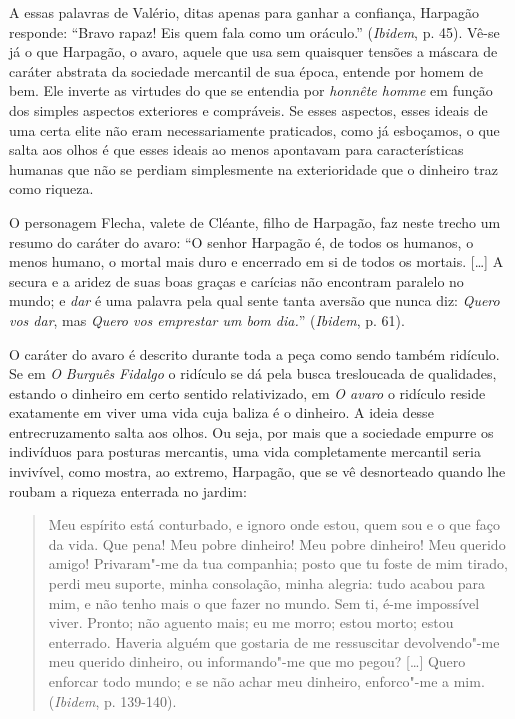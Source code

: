 A essas palavras de Valério, ditas apenas para ganhar a confiança,
Harpagão responde: ``Bravo rapaz! Eis quem fala como um oráculo.''
(\emph{Ibidem}, p. 45). Vê-se já o que Harpagão, o avaro, aquele que usa
sem quaisquer tensões a máscara de caráter abstrata da sociedade
mercantil de sua época, entende por homem de bem. Ele inverte as
virtudes do que se entendia por \emph{honnête homme} em função dos
simples aspectos exteriores e compráveis. Se esses aspectos, esses
ideais de uma certa elite não eram necessariamente praticados, como já
esboçamos, o que salta aos olhos é que esses ideais ao menos apontavam
para características humanas que não se perdiam simplesmente na
exterioridade que o dinheiro traz como riqueza.

O personagem Flecha, valete de Cléante, filho de Harpagão, faz neste
trecho um resumo do caráter do avaro: ``O senhor Harpagão é, de todos os
humanos, o menos humano, o mortal mais duro e encerrado em si de todos
os mortais. [\ldots{}] A secura e a aridez de suas boas graças e
carícias não encontram paralelo no mundo; e \emph{dar} é uma palavra
pela qual sente tanta aversão que nunca diz: \emph{Quero vos dar}, mas
\emph{Quero vos emprestar um bom dia.}'' (\emph{Ibidem}, p. 61).

O caráter do avaro é descrito durante toda a peça como sendo também
ridículo. Se em \emph{O} \emph{Burguês} \emph{Fidalgo} o ridículo se dá
pela busca tresloucada de qualidades, estando o dinheiro em certo
sentido relativizado, em \emph{O avaro} o ridículo reside exatamente em
viver uma vida cuja baliza é o dinheiro. A ideia desse entrecruzamento
salta aos olhos. Ou seja, por mais que a sociedade empurre os indivíduos
para posturas mercantis, uma vida completamente mercantil seria
invivível, como mostra, ao extremo, Harpagão, que se vê desnorteado
quando lhe roubam a riqueza enterrada no jardim:

\begin{quote}
Meu espírito está conturbado, e ignoro onde estou, quem sou e o que faço
da vida. Que pena! Meu pobre dinheiro! Meu pobre dinheiro! Meu querido
amigo! Privaram"-me da tua companhia; posto que tu foste de mim tirado,
perdi meu suporte, minha consolação, minha alegria: tudo acabou para
mim, e não tenho mais o que fazer no mundo. Sem ti, é-me impossível
viver. Pronto; não aguento mais; eu me morro; estou morto; estou
enterrado. Haveria alguém que gostaria de me ressuscitar devolvendo"-me
meu querido dinheiro, ou informando"-me que mo pegou? [\ldots{}]
Quero enforcar todo mundo; e se não achar meu dinheiro, enforco"-me a
mim. (\emph{Ibidem}, p. 139-140).
\end{quote}

